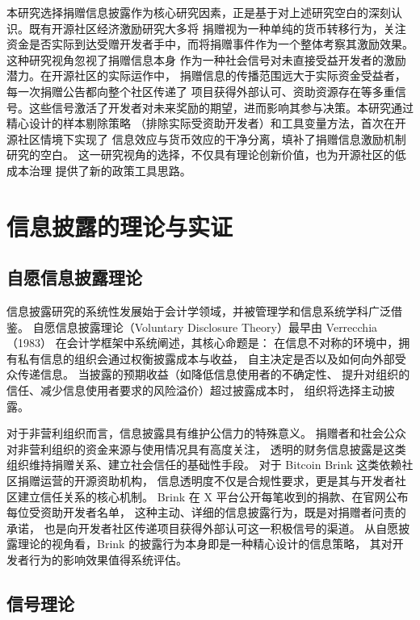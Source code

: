 \documentclass[
    type = master, %
    degree = professional,        %
    decl-page,  %
    twoside,                %
    fontset = fandol %
  ]{njuthesis}
\begin{document}
本研究选择捐赠信息披露作为核心研究因素，正是基于对上述研究空白的深刻认识。既有开源社区经济激励研究大多将
捐赠视为一种单纯的货币转移行为，关注资金是否实际到达受赠开发者手中，而将捐赠事件作为一个整体考察其激励效果。这种研究视角忽视了捐赠信息本身
作为一种社会信号对未直接受益开发者的激励潜力。在开源社区的实际运作中，
捐赠信息的传播范围远大于实际资金受益者，每一次捐赠公告都向整个社区传递了
项目获得外部认可、资助资源存在等多重信号。这些信号激活了开发者对未来奖励的期望，进而影响其参与决策。本研究通过精心设计的样本剔除策略
（排除实际受资助开发者）和工具变量方法，首次在开源社区情境下实现了
信息效应与货币效应的干净分离，填补了捐赠信息激励机制研究的空白。
这一研究视角的选择，不仅具有理论创新价值，也为开源社区的低成本治理
提供了新的政策工具思路。

\section{信息披露的理论与实证}

\subsection{自愿信息披露理论}

信息披露研究的系统性发展始于会计学领域，并被管理学和信息系统学科广泛借鉴。
自愿信息披露理论（Voluntary Disclosure Theory）最早由 Verrecchia（1983）
在会计学框架中系统阐述\cite{verrecchia1983discretionary}，其核心命题是：
在信息不对称的环境中，拥有私有信息的组织会通过权衡披露成本与收益，
自主决定是否以及如何向外部受众传递信息。
当披露的预期收益（如降低信息使用者的不确定性、
提升对组织的信任、减少信息使用者要求的风险溢价）超过披露成本时，
组织将选择主动披露\cite{verrecchia1983discretionary}。

对于非营利组织而言，信息披露具有维护公信力的特殊意义。
捐赠者和社会公众对非营利组织的资金来源与使用情况具有高度关注，
透明的财务信息披露是这类组织维持捐赠关系、建立社会信任的基础性手段\cite{liu2015nonprofit}。
对于 Bitcoin Brink 这类依赖社区捐赠运营的开源资助机构，
信息透明度不仅是合规性要求，更是其与开发者社区建立信任关系的核心机制。
Brink 在 X 平台公开每笔收到的捐款、在官网公布每位受资助开发者名单，
这种主动、详细的信息披露行为，既是对捐赠者问责的承诺，
也是向开发者社区传递项目获得外部认可这一积极信号的渠道。
从自愿披露理论的视角看，Brink 的披露行为本身即是一种精心设计的信息策略，
其对开发者行为的影响效果值得系统评估。

\subsection{信号理论}
\end{document}
